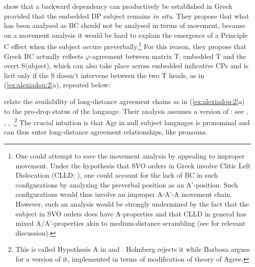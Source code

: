 \documentclass[output=paper]{langsci/langscibook}
\begin{document}
\citet{Tsakali2017} show that a backward dependency can productively be established in Greek provided that the embedded DP subject remains \textit{in situ}. They propose that what has been analysed as BC should not be analysed in terms of movement, because on a movement analysis it would be hard to explain the emergence of a Principle C effect when the subject occurs preverbally.\footnote{One could attempt to save the movement analysis by appealing to improper movement. Under the hypothesis that SVO orders in Greek involve Clitic Left Dislocation (CLLD; \citealt{Alexiadou1998}), one could account for the lack of BC in such configurations by analyzing the preverbal position as an A’-position. Such configurations would thus involve an improper A-A’-A movement chain. However, such an analysis would be strongly undermined by the fact that the subject in SVO orders does have A-properties and that CLLD in general has mixed A\slash A’-properties akin to medium-distance scrambling (see \citealt{Miyagawa2017} for relevant discussion).}  For this reason, they propose that Greek BC actually reflects $\varphi ${}-agreement between matrix T, embedded T and the overt S(ubject), which can also take place across embedded indicative CPs and is licit only if the S doesn’t intervene between the two T heads, as in (\ref{ex:alexiadou:2}a), repeated below:

\begin{exe}%
    \z
\end{exe}


\citet{Tsakali2017} relate the availability of long-distance agreement chains as in (\ref{ex:alexiadou:2}a) to the pro-drop status of the language. Their analysis assumes a version of : see \citet{Rizzi1982}, \citet{Alexiadou1998}, \citet{Holmberg2005}, \citet{Barbosa2009}.\footnote{This is called Hypothesis A in \citet{Holmberg2005} and \citet{Barbosa2009}. Holmberg rejects it while Barbosa argues for a version of it, implemented in terms of  modification of  theory of Agree.} The crucial intuition is that Agr in null subject languages is pronominal and can thus enter long-distance agreement relationships, like pronouns.
\end{document}
